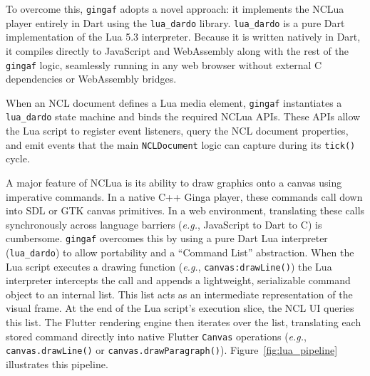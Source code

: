 \documentclass[sigconf]{webmedia}
\newcommand{\projectname}{\texttt{gingaf}}
\begin{document}
To overcome this, \projectname{} adopts a novel approach: it implements the NCLua player entirely in Dart using the \texttt{lua\_dardo} library. \texttt{lua\_dardo} is a pure Dart implementation of the Lua 5.3 interpreter. Because it is written natively in Dart, it compiles directly to JavaScript and WebAssembly along with the rest of the \projectname{} logic, seamlessly running in any web browser without external C dependencies or WebAssembly bridges.

When an NCL document defines a Lua media element, \projectname{} instantiates a \texttt{lua\_dardo} state machine and binds the required NCLua APIs. These APIs allow the Lua script to register event listeners, query the NCL document properties, and emit events that the main \texttt{NCLDocument} logic can capture during its \texttt{tick()} cycle.

A major feature of NCLua is its ability to draw graphics onto a canvas using imperative commands. In a native C++ Ginga player, these commands call down into SDL or GTK canvas primitives. In a web environment, translating these calls synchronously across language barriers (\textit{e.g.}, JavaScript to Dart to C) is cumbersome. \projectname{} overcomes this by using a pure Dart Lua interpreter (\texttt{lua\_dardo}) to allow portability and a ``Command List'' abstraction. When the Lua script executes a drawing function (\textit{e.g.}, \texttt{canvas:drawLine()}) the Lua interpreter intercepts the call and appends a lightweight, serializable command object to an internal list. This list acts as an intermediate representation of the visual frame. At the end of the Lua script's execution slice, the NCL UI queries this list. The Flutter rendering engine then iterates over the list, translating each stored command directly into native Flutter \texttt{Canvas} operations (\textit{e.g.}, \texttt{canvas.drawLine()} or \texttt{canvas.drawParagraph()}). Figure~\ref{fig:lua_pipeline} illustrates this pipeline.
\end{document}

